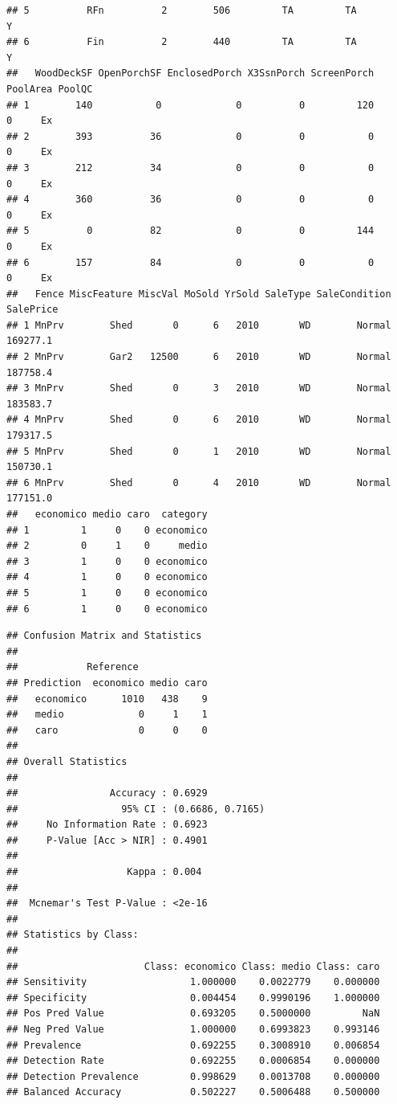 \documentclass[
]{article}
\begin{document}
\begin{verbatim}
## 5          RFn          2        506         TA         TA          Y
## 6          Fin          2        440         TA         TA          Y
##   WoodDeckSF OpenPorchSF EnclosedPorch X3SsnPorch ScreenPorch PoolArea PoolQC
## 1        140           0             0          0         120        0     Ex
## 2        393          36             0          0           0        0     Ex
## 3        212          34             0          0           0        0     Ex
## 4        360          36             0          0           0        0     Ex
## 5          0          82             0          0         144        0     Ex
## 6        157          84             0          0           0        0     Ex
##   Fence MiscFeature MiscVal MoSold YrSold SaleType SaleCondition SalePrice
## 1 MnPrv        Shed       0      6   2010       WD        Normal  169277.1
## 2 MnPrv        Gar2   12500      6   2010       WD        Normal  187758.4
## 3 MnPrv        Shed       0      3   2010       WD        Normal  183583.7
## 4 MnPrv        Shed       0      6   2010       WD        Normal  179317.5
## 5 MnPrv        Shed       0      1   2010       WD        Normal  150730.1
## 6 MnPrv        Shed       0      4   2010       WD        Normal  177151.0
##   economico medio caro  category
## 1         1     0    0 economico
## 2         0     1    0     medio
## 3         1     0    0 economico
## 4         1     0    0 economico
## 5         1     0    0 economico
## 6         1     0    0 economico
\end{verbatim}

\begin{verbatim}
## Confusion Matrix and Statistics
## 
##            Reference
## Prediction  economico medio caro
##   economico      1010   438    9
##   medio             0     1    1
##   caro              0     0    0
## 
## Overall Statistics
##                                           
##                Accuracy : 0.6929          
##                  95% CI : (0.6686, 0.7165)
##     No Information Rate : 0.6923          
##     P-Value [Acc > NIR] : 0.4901          
##                                           
##                   Kappa : 0.004           
##                                           
##  Mcnemar's Test P-Value : <2e-16          
## 
## Statistics by Class:
## 
##                      Class: economico Class: medio Class: caro
## Sensitivity                  1.000000    0.0022779    0.000000
## Specificity                  0.004454    0.9990196    1.000000
## Pos Pred Value               0.693205    0.5000000         NaN
## Neg Pred Value               1.000000    0.6993823    0.993146
## Prevalence                   0.692255    0.3008910    0.006854
## Detection Rate               0.692255    0.0006854    0.000000
## Detection Prevalence         0.998629    0.0013708    0.000000
## Balanced Accuracy            0.502227    0.5006488    0.500000
\end{verbatim}
\end{document}
